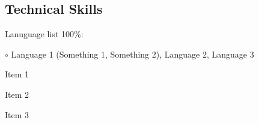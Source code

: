 \subsection*{Technical Skills}

\begin{itemize*}
  \item Lanuguage list 100\%: %
  \begin{itemize*}
    \vspace{-0.2em}
    \item[$\circ$] Language 1 (Something 1, Something 2), Language 2, Language 3
    \vspace{-0.2em}
  \end{itemize*}
    \vspace{-0.2em}
  \item Item 1
  \item Item 2
  \item Item 3
\end{itemize*}


